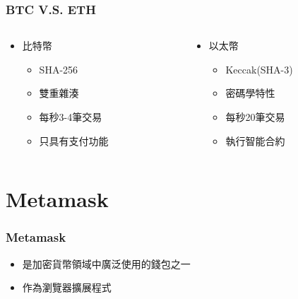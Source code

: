 \documentclass[xcolor=dvipsnames]{beamer}
\begin{document}
\begin{frame}
\frametitle{BTC V.S. ETH}
\begin{columns}
    \begin{column}{0.5\textwidth} %
    \begin{block}{
\begin{itemize}
    \item 比特幣
    \begin{itemize}
        \item SHA-256
    \pause
        \item 雙重雜湊
    \pause
        \item 每秒3-4筆交易
    \pause
        \item 只具有支付功能
    \end{itemize}
\end{itemize}}
\end{block}
    \end{column}
    \pause
    \begin{column}{0.5\textwidth} %
    \begin{block}{
\begin{itemize}
    \item 以太幣
    \pause
    \begin{itemize}
        \item Keccak(SHA-3)
    \pause
        \item 密碼學特性
    \pause
        \item 每秒20筆交易
    \pause
        \item 執行智能合約
    \end{itemize}
\end{itemize}}
\end{block}
    \end{column}
\end{columns}
\end{frame}

\section{Metamask}

\begin{frame}
\frametitle{Metamask}
\begin{itemize}
        \item 是加密貨幣領域中廣泛使用的錢包之一
        \item 作為瀏覽器擴展程式
\end{itemize}
\begin{figure}
    \end{figure}
    \end{frame}
    
\end{document}

